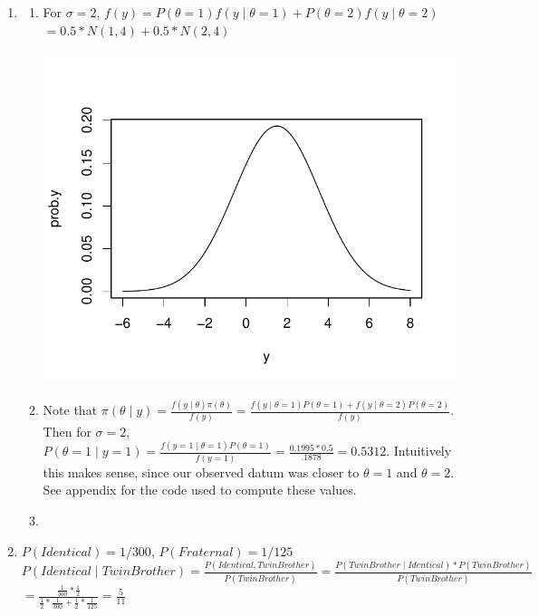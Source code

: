 \documentclass[12pt]{article}\usepackage[]{graphicx}\usepackage[]{color}
\newenvironment{knitrout}{}{} %
\begin{document}
\begin{enumerate}
\begin{enumerate}
\item
\item
\item
\item
\item
\item
\end{enumerate}
\item
\begin{enumerate}
\item For $\sigma = 2$, $f(y) = P(\theta=1)f(y \mid \theta=1) + P(\theta=2)f(y \mid \theta=2)$\\

$=0.5*N(1,4)+0.5*N(2,4)$
\begin{knitrout}\footnotesize
{}\color{fgcolor}

{\centering \includegraphics[width=.5\linewidth]{figure/11a-1} 

}



\end{knitrout}
\item Note that $\pi(\theta \mid y)=\frac{f(y \mid \theta)\pi(\theta)}{f(y)}=\frac{f(y \mid \theta=1)P(\theta=1) + f(y \mid \theta=2)P(\theta=2)}{f(y)}$.\\

Then for $\sigma=2$, $P(\theta=1 \mid y=1)=\frac{f(y=1 \mid \theta=1)P(\theta=1)}{f(y=1)}= \frac{0.1995*0.5}{.1878}=0.5312$. Intuitively this makes sense, since our observed datum was closer to $\theta=1$ and $\theta=2$. See appendix for the code used to compute these values.

\item ~

\end{enumerate}
\item $P(Identical)=1/300$, $P(Fraternal)=1/125$\\

$P(Identical \mid Twin Brother) = \frac{P(Identical, Twin Brother)}{P(Twin Brother)}=\frac{P(Twin Brother \mid Identical)* P(Twin Brother)}{P(Twin Brother)}$\\
$=\frac{\frac{1}{300}*\frac{1}{2}}{\frac{1}{2}*\frac{1}{300}+\frac{1}{2}*\frac{1}{125}}=\frac{5}{11}$


\end{enumerate}
\end{document}

